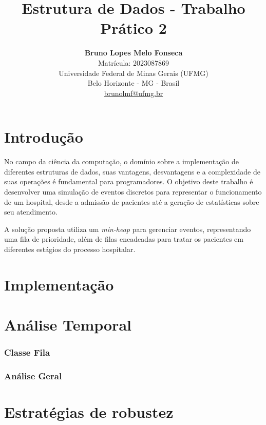 \documentclass{article}
\title{\textbf{Estrutura de Dados - Trabalho Prático 2 }}
\author{
    \textbf{Bruno Lopes Melo Fonseca} \\
    Matrícula: 2023087869 \\
    \bigskip
    Universidade Federal de Minas Gerais (UFMG) \\
    Belo Horizonte - MG - Brasil \\
    \href{mailto:email@ufmg.br}{brunolmf@ufmg.br}
}
\date{}
\begin{document}
\maketitle


\section{Introdução}

No campo da ciência da computação, o domínio sobre a implementação de diferentes estruturas de dados, suas vantagens, desvantagens e a complexidade de suas operações é fundamental para programadores. O objetivo deste trabalho é desenvolver uma simulação de eventos discretos para representar o funcionamento de um hospital, desde a admissão de pacientes até a geração de estatísticas sobre seu atendimento.

A solução proposta utiliza um \textit{min-heap} para gerenciar eventos, representando uma fila de prioridade, além de filas encadeadas para tratar os pacientes em diferentes estágios do processo hospitalar.

\section{Implementação}



\section{Análise Temporal}


\subsubsection{Classe Fila}

\subsubsection{Análise Geral}


\section{Estratégias de robustez}
\end{document}
